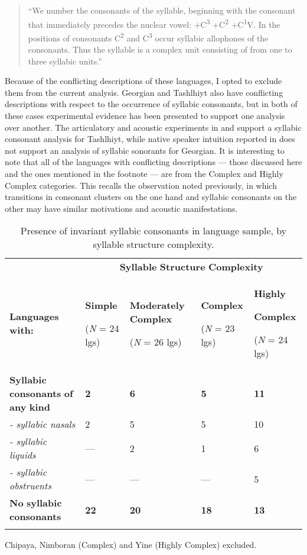 \begin{quote}
“We number the consonants of the syllable, beginning with the consonant that immediately precedes the nuclear vowel: +C\textsuperscript{3} +C\textsuperscript{2} +C\textsuperscript{1}V. In the positions of consonants C\textsuperscript{2} and C\textsuperscript{3} occur syllabic allophones of the consonants. Thus the syllable is a complex unit consisting of from one to three syllabic units.” 

\citep[23]{Matteson1965}
\end{quote}

Because of the conflicting descriptions of these languages, I opted to exclude them from the current analysis. Georgian and Tashlhiyt also have conflicting descriptions with respect to the occurrence of syllabic consonants, but in both of these cases experimental evidence has been presented to support one analysis over another. The articulatory and acoustic experiments in \citet{Ridouane2008} and \citet{GoldsteinEtAl2007} support a syllabic consonant analysis for Tashlhiyt, while native speaker intuition reported in \citet{Chitoran1999} does not support an analysis of syllabic sonorants for Georgian. It is interesting to note that all of the languages with conflicting descriptions — those discussed here and the ones mentioned in the footnote — are from the Complex and Highly Complex categories. This recalls the observation noted previously, in which transitions in consonant clusters on the one hand and syllabic consonants on the other may have similar motivations and acoustic manifestations.

\begin{table}
\begin{tabularx}{\textwidth}{XXXXX}
 & \multicolumn{4}{c}{ \textbf{Syllable} \textbf{Structure} \textbf{Complexity}}\\
\lsptoprule
 \textbf{Languages} \textbf{with:} & { \textbf{Simple}}

 (\textit{N} = 24 lgs) & { \textbf{Moderately} \textbf{Complex}}

 (\textit{N} = 26 lgs) & { \textbf{Complex}}

 (\textit{N} = 23 lgs) & { \textbf{Highly} }

{ \textbf{Complex}}

 (\textit{N} = 24 lgs)\\
 \textbf{Syllabic} \textbf{consonants} \textbf{of} \textbf{any} \textbf{kind} & \textbf{2} & \textbf{6} & \textbf{5} & \textbf{11}\\
 \textit{- syllabic nasals} & 2 & 5 & 5 & 10\\
 \textit{- syllabic liquids} & — & 2 & 1 & 6\\
 \textit{- syllabic obstruents} & — & — & — & 5\\
 \textbf{No} \textbf{syllabic} \textbf{consonants} & \textbf{22} & \textbf{20} & \textbf{18} & \textbf{13}\\
\lspbottomrule
\end{tabularx}
\caption{\label{3.6}Presence of invariant syllabic consonants in language sample, by syllable structure complexity.}Chipaya, Nimboran (Complex) and Yine (Highly Complex) excluded.
\end{table}


